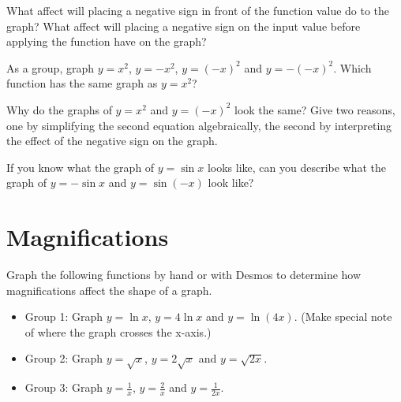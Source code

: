 \documentclass[number]{ximera}
\begin{document}
\begin{question}
What affect will placing a negative sign in front of the function value do to the graph? What affect will placing a negative sign on the input value before applying the function have on the graph?
\begin{freeResponse}\end{freeResponse}
\end{question}

\begin{problem}
As a group, graph $y = x^2$, $y = -x^2$, $y = (-x)^2$ and $y = -(-x)^2$. Which function has the same graph as $y=x^2$?
\begin{multipleChoice}
\end{multipleChoice}
\end{problem}

\begin{question}
Why do the graphs of $y = x^2$ and $y = (-x)^2$ look the same? Give two reasons, one by simplifying the second equation algebraically, the second by interpreting the effect of the negative sign on the graph.
\begin{freeResponse}\end{freeResponse}
\end{question}

\begin{question}
If you know what the graph of $y = \sin x$ looks like, can you describe what the graph of $y = - \sin x$ and $y = \sin (-x)$ look like?
\begin{freeResponse}\end{freeResponse}
\end{question}


\section{Magnifications}

\begin{problem}
Graph the following functions by hand or with Desmos to determine how magnifications affect the shape of a graph.
\begin{itemize}
\item Group 1: Graph $y = \ln x$, $y = 4 \ln x$ and $y = \ln {(4x)}$. (Make special note of where the graph crosses the x-axis.)
\item Group 2: Graph $y = \sqrt x$, $y = 2 \sqrt x$ and $y = \sqrt {2x}$.
\item Group 3: Graph $y = \frac{1}{x}$, $y = \frac{2}{x}$ and $y = \frac{1}{2x}$. 
\end{itemize}
\end{problem}
\end{document}
